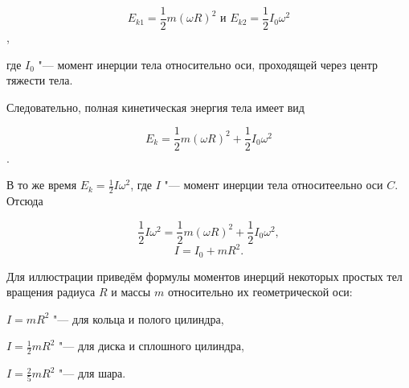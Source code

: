 \begin{equation}
    E_{k1} = \frac{1}{2} m (\omega R)^2 
    \text{ и }
    E_{k2} = \frac{1}{2}I_0 \omega^2
\end{equation},

где $I_0$ "---  момент инерции тела относительно оси, проходящей через центр тяжести тела.

Следовательно, полная кинетическая энергия тела имеет вид

\begin{equation}
    E_k = \frac{1}{2}m(\omega R)^2 + \frac{1}{2}I_0\omega^2
\end{equation}.

В то же время $E_k = \frac{1}{2}I\omega^2$, где $I$ "--- момент инерции тела относитеельно оси $C$.
Отсюда

\begin{equation*}
    \frac{1}{2}I\omega^2 = \frac{1}{2}m(\omega R)^2 + \frac{1}{2}I_0\omega^2,
\end{equation*}
\begin{equation}
    I = I_0 + mR^2.
\end{equation}

Для иллюстрации приведём формулы моментов инерций некоторых простых тел вращения радиуса $R$ и массы $m$ относительно их геометрической оси:

$I = mR^2$ "--- для кольца и полого цилиндра,
    
$I = \frac{1}{2}mR^2$ "--- для диска и сплошного цилиндра,

$I = \frac{2}{5}mR^2$ "--- для шара. 